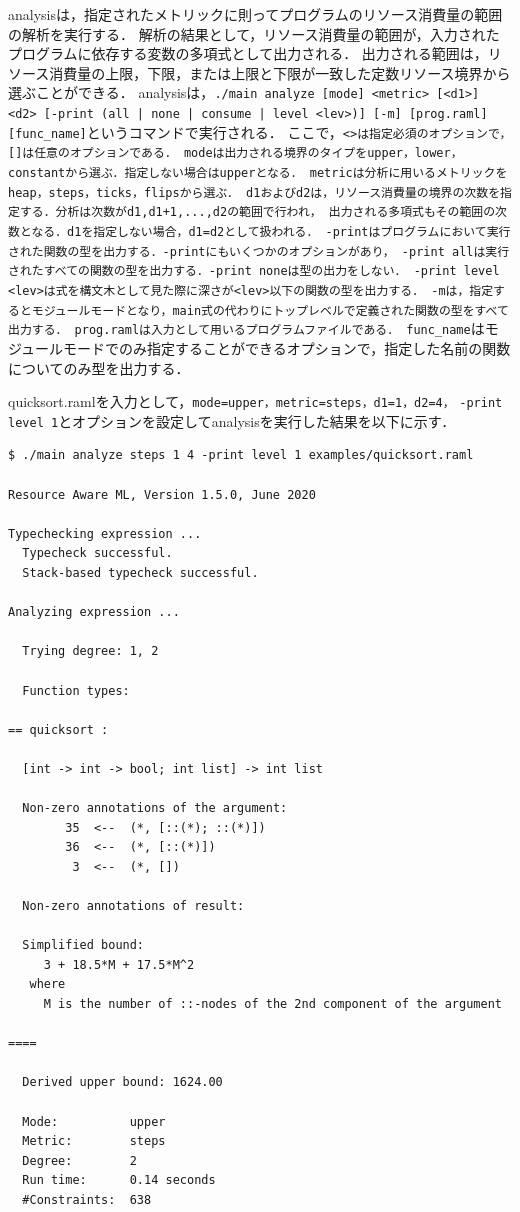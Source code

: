 \documentclass{kuisthesis}
\begin{document}
analysisは，指定されたメトリックに則ってプログラムのリソース消費量の範囲の解析を実行する．
解析の結果として，リソース消費量の範囲が，入力されたプログラムに依存する変数の多項式として出力される．
出力される範囲は，リソース消費量の上限，下限，または上限と下限が一致した定数リソース境界から選ぶことができる．
analysisは，{\tt ./main analyze [mode] <metric> [<d1>] <d2> [-print (all | none | consume | level <lev>)] [-m] [prog.raml]} \\ {\tt [func\_name]}というコマンドで実行される．
ここで，{\tt <>は指定必須のオプションで，[]は任意のオプションである．
modeは出力される境界のタイプをupper，lower，constantから選ぶ．指定しない場合はupperとなる．
metricは分析に用いるメトリックをheap，steps，ticks，flipsから選ぶ．
d1およびd2は，リソース消費量の境界の次数を指定する．分析は次数がd1,d1+1,...,d2の範囲で行われ，
出力される多項式もその範囲の次数となる．d1を指定しない場合，d1=d2として扱われる．
-printはプログラムにおいて実行された関数の型を出力する．-printにもいくつかのオプションがあり，
-print allは実行されたすべての関数の型を出力する．-print noneは型の出力をしない．
-print level <lev>は式を構文木として見た際に深さが<lev>以下の関数の型を出力する．
-mは，指定するとモジュールモードとなり，main式の代わりにトップレベルで定義された関数の型をすべて出力する．
prog.ramlは入力として用いるプログラムファイルである．
func\_name}はモジュールモードでのみ指定することができるオプションで，指定した名前の関数についてのみ型を出力する．

quicksort.ramlを入力として，{\tt mode=upper，metric=steps，d1=1，d2=4，}
{\tt -print level 1}とオプションを設定してanalysisを実行した結果を以下に示す．

\begin{lstlisting}[basicstyle={\ttfamily\color{base}\scriptsize}]
$ ./main analyze steps 1 4 -print level 1 examples/quicksort.raml

Resource Aware ML, Version 1.5.0, June 2020

Typechecking expression ...
  Typecheck successful.
  Stack-based typecheck successful.

Analyzing expression ...

  Trying degree: 1, 2

  Function types:

== quicksort :

  [int -> int -> bool; int list] -> int list

  Non-zero annotations of the argument:
        35  <--  (*, [::(*); ::(*)])
        36  <--  (*, [::(*)])
         3  <--  (*, [])

  Non-zero annotations of result:

  Simplified bound:
     3 + 18.5*M + 17.5*M^2
   where
     M is the number of ::-nodes of the 2nd component of the argument

====

  Derived upper bound: 1624.00

  Mode:          upper
  Metric:        steps
  Degree:        2
  Run time:      0.14 seconds
  #Constraints:  638
\end{lstlisting}
\end{document}
